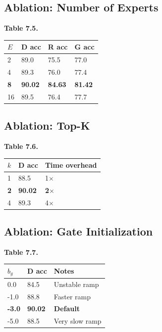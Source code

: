 \subsection{Ablation: Number of Experts}

\textbf{Table 7.5.}

\begin{table}[H]
\centering
\small
\begin{tabular}{llll}
\toprule
\textbf{$E$} & \textbf{D acc} & \textbf{R acc} & \textbf{G acc} \\
\midrule
2 & 89.0 & 75.5 & 77.0 \\
4 & 89.3 & 76.0 & 77.4 \\
\textbf{8} & \textbf{90.02} & \textbf{84.63} & \textbf{81.42} \\
16 & 89.5 & 76.4 & 77.7 \\
\bottomrule
\end{tabular}
\end{table}

\subsection{Ablation: Top-K}

\textbf{Table 7.6.}

\begin{table}[H]
\centering
\small
\begin{tabular}{lll}
\toprule
\textbf{$k$} & \textbf{D acc} & \textbf{Time overhead} \\
\midrule
1 & 88.5 & 1$\times$ \\
\textbf{2} & \textbf{90.02} & \textbf{2$\times$} \\
4 & 89.3 & 4$\times$ \\
\bottomrule
\end{tabular}
\end{table}

\subsection{Ablation: Gate Initialization}

\textbf{Table 7.7.}

\begin{table}[H]
\centering
\small
\begin{tabular}{lll}
\toprule
\textbf{$b_g$} & \textbf{D acc} & \textbf{Notes} \\
\midrule
0.0 & 84.5 & Unstable ramp \\
-1.0 & 88.8 & Faster ramp \\
\textbf{-3.0} & \textbf{90.02} & \textbf{Default} \\
-5.0 & 88.5 & Very slow ramp \\
\bottomrule
\end{tabular}
\end{table}

